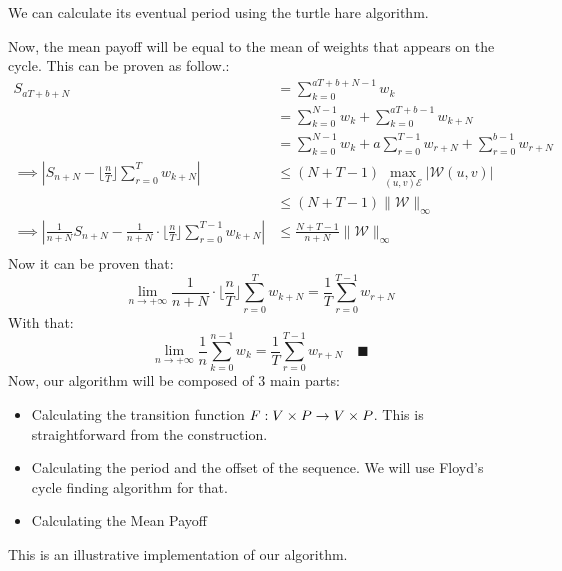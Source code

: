 We can calculate its eventual period using the turtle hare algorithm. %

Now, the mean payoff will be equal to the mean of weights that appears on the cycle. \newline
This can be proven as follow.:
\begin{align*}
	S_{aT+b+N}&=\sum_{k=0}^{aT+b+N-1} w_{k} \\
	&= \sum_{k=0}^{N-1}  w_{k}  + \sum_{k=0}^{aT+b-1} w_{k+N} \\
	&= \sum_{k=0}^{N-1}  w_{k}  + a\sum_{r=0}^{T-1} w_{r+N} +  \sum_{r=0}^{b-1} w_{r+N} \\
	\implies \left \lvert S_{n+N}- \lfloor \frac{n}{T}\rfloor \sum_{r=0}^T w_{k+N}  \right\rvert &\le (N+T-1) \max_{(u,v)\mathcal{E}} \lvert \mathcal{W}(u,v) \rvert  \\
	&\le (N+T-1) \lVert \mathcal{W} \rVert_{\infty} \\
\implies \left \lvert \frac{1}{n+N}S_{n+N}-\frac{1}{n+N} \cdot \lfloor \frac{n}{T}\rfloor \sum_{r=0}^{T-1} w_{k+N}  \right\rvert &\le \frac{N+T-1}{n+N}  \lVert \mathcal{W} \rVert_{\infty} \\
\end{align*}
Now it can be proven that:
$$
\lim_{n\rightarrow +\infty } \frac{1}{n+N} \cdot \lfloor \frac{n}{T}\rfloor \sum_{r=0}^T w_{k+N}  = \frac{1}{T}\sum_{r=0}^{T-1}w_{r+N}
$$
With that:
$$
\lim_{n\rightarrow +\infty} \frac{1}{n}\sum_{k=0}^{n-1} w_k=\frac{1}{T}\sum_{r=0}^{T-1}w_{r+N}  \quad \blacksquare
$$
Now, our algorithm will be composed of $3$ main parts:
\begin{itemize}
	\item Calculating the transition function $F:V\times P \rightarrow V\times P$. This is straightforward from the construction.
	\item Calculating the period and the offset of the sequence. We will use Floyd's cycle finding algorithm for that.
	\item Calculating the Mean Payoff
\end{itemize}
This is an illustrative implementation of our algorithm.
